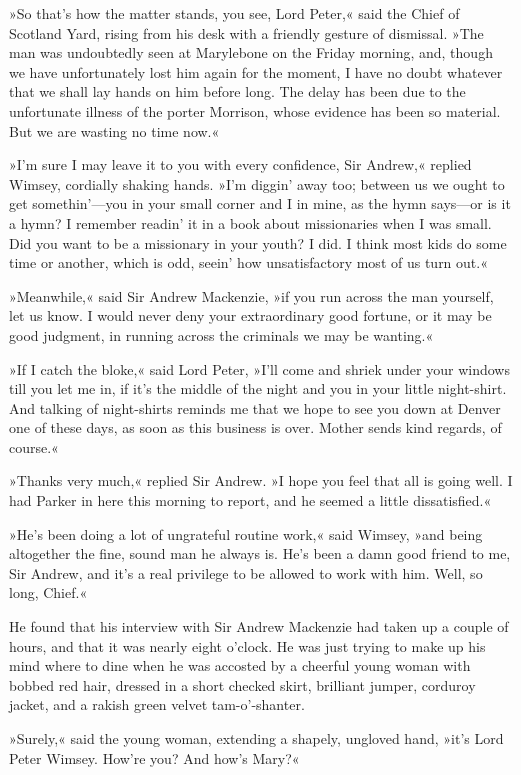 »So that's how the matter stands, you see, Lord Peter,« said the Chief of Scotland Yard, rising from his desk with a friendly gesture of dismissal. »The man was undoubtedly seen at Marylebone on the Friday morning, and, though we have unfortunately lost him again for the moment, I have no doubt whatever that we shall lay hands on him before long. The delay has been due to the unfortunate illness of the porter Morrison, whose evidence has been so material. But we are wasting no time now.«

»I'm sure I may leave it to you with every confidence, Sir Andrew,« replied Wimsey, cordially shaking hands. »I'm diggin' away too; between us we ought to get somethin'—you in your small corner and I in mine, as the hymn says—or is it a hymn? I remember readin' it in a book about missionaries when I was small. Did you want to be a missionary in your youth? I did. I think most kids do some time or another, which is odd, seein' how unsatisfactory most of us turn out.«

»Meanwhile,« said Sir Andrew Mackenzie, »if you run across the man yourself, let us know. I would never deny your extraordinary good fortune, or it may be good judgment, in running across the criminals we may be wanting.«

»If I catch the bloke,« said Lord Peter, »I'll come and shriek under your windows till you let me in, if it's the middle of the night and you in your little night-shirt. And talking of night-shirts reminds me that we hope to see you down at Denver one of these days, as soon as this business is over. Mother sends kind regards, of course.«

»Thanks very much,« replied Sir Andrew. »I hope you feel that all is going well. I had Parker in here this morning to report, and he seemed a little dissatisfied.«

»He's been doing a lot of ungrateful routine work,« said Wimsey, »and being altogether the fine, sound man he always is. He's been a damn good friend to me, Sir Andrew, and it's a real privilege to be allowed to work with him. Well, so long, Chief.«

He found that his interview with Sir Andrew Mackenzie had taken up a couple of hours, and that it was nearly eight o'clock. He was just trying to make up his mind where to dine when he was accosted by a cheerful young woman with bobbed red hair, dressed in a short checked skirt, brilliant jumper, corduroy jacket, and a rakish green velvet tam-o'-shanter.

»Surely,« said the young woman, extending a shapely, ungloved hand, »it's Lord Peter Wimsey. How're you? And how's Mary?«

